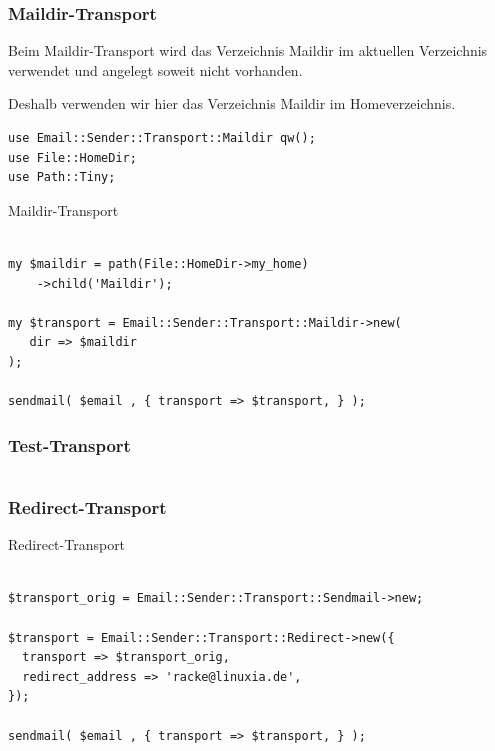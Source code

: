 \subsubsection{Maildir-Transport}

Beim Maildir-Transport wird das Verzeichnis Maildir im aktuellen Verzeichnis
verwendet und angelegt soweit nicht vorhanden.

Deshalb verwenden wir hier das Verzeichnis Maildir im Homeverzeichnis.

\begin{lstlisting}
use Email::Sender::Transport::Maildir qw();
use File::HomeDir;
use Path::Tiny;
\end{lstlisting}

\begin{frame}[fragile]{Maildir-Transport}
  \begin{verbatim}

my $maildir = path(File::HomeDir->my_home)
    ->child('Maildir');

my $transport = Email::Sender::Transport::Maildir->new(
   dir => $maildir
);

sendmail( $email , { transport => $transport, } );

\end{verbatim}
\end{frame}

\subsubsection{Test-Transport}

\begin{verbatim}

\end{verbatim}

\subsubsection{Redirect-Transport}

\begin{frame}[fragile]{Redirect-Transport}
  \begin{verbatim}

$transport_orig = Email::Sender::Transport::Sendmail->new;

$transport = Email::Sender::Transport::Redirect->new({
  transport => $transport_orig,
  redirect_address => 'racke@linuxia.de',
});

sendmail( $email , { transport => $transport, } );

\end{verbatim}
\end{frame}

